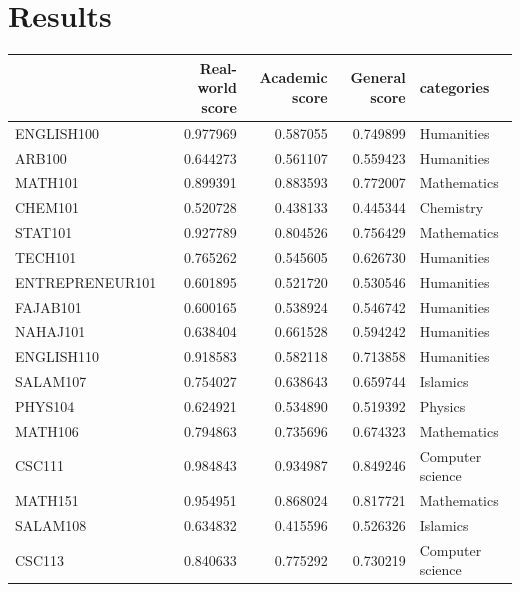 \documentclass[12pt,a4paper]{article}
\begin{document}
\section{Results}
\hskip-1.7cm
\begin{tabular}{lrrrl}
\toprule
{} &  Real-world score &  Academic score &  General score &        categories \\
\midrule
ENGLISH100      &          0.977969 &        0.587055 &       0.749899 &        Humanities \\
ARB100          &          0.644273 &        0.561107 &       0.559423 &        Humanities \\
MATH101         &          0.899391 &        0.883593 &       0.772007 &       Mathematics \\
CHEM101         &          0.520728 &        0.438133 &       0.445344 &         Chemistry \\
STAT101         &          0.927789 &        0.804526 &       0.756429 &       Mathematics \\
TECH101         &          0.765262 &        0.545605 &       0.626730 &        Humanities \\
ENTREPRENEUR101 &          0.601895 &        0.521720 &       0.530546 &        Humanities \\
FAJAB101        &          0.600165 &        0.538924 &       0.546742 &        Humanities \\
NAHAJ101        &          0.638404 &        0.661528 &       0.594242 &        Humanities \\
ENGLISH110      &          0.918583 &        0.582118 &       0.713858 &        Humanities \\
SALAM107        &          0.754027 &        0.638643 &       0.659744 &          Islamics \\
PHYS104         &          0.624921 &        0.534890 &       0.519392 &           Physics \\
MATH106         &          0.794863 &        0.735696 &       0.674323 &       Mathematics \\
CSC111          &          0.984843 &        0.934987 &       0.849246 &  Computer science \\
MATH151         &          0.954951 &        0.868024 &       0.817721 &       Mathematics \\
SALAM108        &          0.634832 &        0.415596 &       0.526326 &          Islamics \\
CSC113          &          0.840633 &        0.775292 &       0.730219 &  Computer science \\

\end{tabular}
\end{document}

